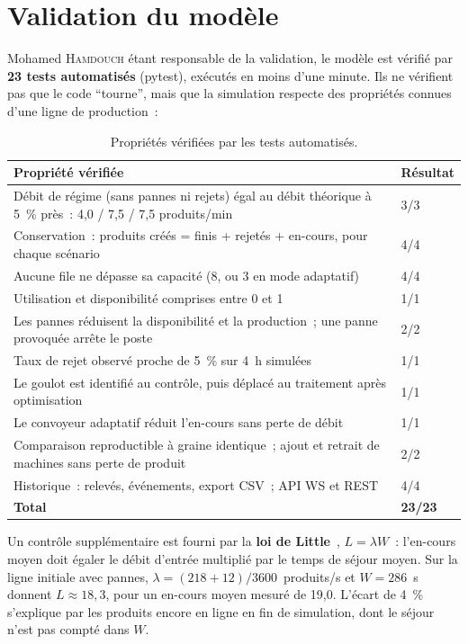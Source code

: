 \section{Validation du modèle}

Mohamed \textsc{Hamdouch} étant responsable de la validation, le modèle est vérifié par \textbf{23 tests automatisés} (pytest), exécutés en moins d'une minute. Ils ne vérifient pas que le code \enquote{tourne}, mais que la simulation respecte des propriétés connues d'une ligne de production~:

\begin{table}[H]
\centering
\caption{Propriétés vérifiées par les tests automatisés.}
\label{tab:tests}
\begin{tabularx}{\textwidth}{@{}X l@{}}
\toprule
\textbf{Propriété vérifiée} & \textbf{Résultat} \\
\midrule
Débit de régime (sans pannes ni rejets) égal au débit théorique à 5~\% près~: 4,0 / 7,5 / 7,5 produits/min & 3/3 \\
Conservation~: produits créés = finis + rejetés + en-cours, pour chaque scénario & 4/4 \\
Aucune file ne dépasse sa capacité (8, ou 3 en mode adaptatif) & 4/4 \\
Utilisation et disponibilité comprises entre 0 et 1 & 1/1 \\
Les pannes réduisent la disponibilité et la production~; une panne provoquée arrête le poste & 2/2 \\
Taux de rejet observé proche de 5~\% sur 4~h simulées & 1/1 \\
Le goulot est identifié au contrôle, puis déplacé au traitement après optimisation & 1/1 \\
Le convoyeur adaptatif réduit l'en-cours sans perte de débit & 1/1 \\
Comparaison reproductible à graine identique~; ajout et retrait de machines sans perte de produit & 2/2 \\
Historique~: relevés, événements, export \ac{CSV}~; \ac{API} \ac{WS} et \ac{REST} & 4/4 \\
\midrule
\textbf{Total} & \textbf{23/23} \\
\bottomrule
\end{tabularx}
\end{table}

Un contrôle supplémentaire est fourni par la \textbf{loi de Little}~\cite{little1961}, $L = \lambda W$~: l'en-cours moyen doit égaler le débit d'entrée multiplié par le temps de séjour moyen. Sur la ligne initiale avec pannes, $\lambda = (218 + 12)/3600$~produits/s et $W = 286$~s donnent $L \approx 18{,}3$, pour un en-cours moyen mesuré de 19{,}0. L'écart de 4~\% s'explique par les produits encore en ligne en fin de simulation, dont le séjour n'est pas compté dans $W$.
